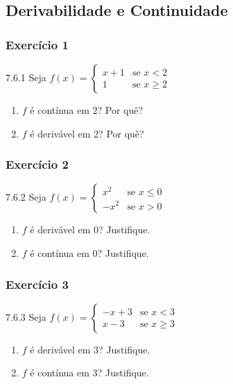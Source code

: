 \clearpage

\subsection{Derivabilidade e Continuidade}

\subsubsection*{Exercício 1}
\begin{exercicio}[1]{7.6.1}
Seja $f(x) = \begin{cases} x + 1 & \text{se } x < 2 \\ 1 & \text{se } x \ge 2 \end{cases}$
\begin{enumerate}[label=\alph*)]
    \item $f$ é contínua em 2? Por quê?
    \item $f$ é derivável em 2? Por quê?
\end{enumerate}
\end{exercicio}

\subsubsection*{Exercício 2}
\begin{exercicio}[2]{7.6.2}
Seja $f(x) = \begin{cases} x^2 & \text{se } x \le 0 \\ -x^2 & \text{se } x > 0 \end{cases}$
\begin{enumerate}[label=\alph*)]
    \item $f$ é derivável em 0? Justifique.
    \item $f$ é contínua em 0? Justifique.
\end{enumerate}
\end{exercicio}

\subsubsection*{Exercício 3}
\begin{exercicio}[3]{7.6.3}
Seja $f(x) = \begin{cases} -x + 3 & \text{se } x < 3 \\ x - 3 & \text{se } x \ge 3 \end{cases}$
\begin{enumerate}[label=\alph*)]
    \item $f$ é derivável em 3? Justifique.
    \item $f$ é contínua em 3? Justifique.
\end{enumerate}
\end{exercicio}


